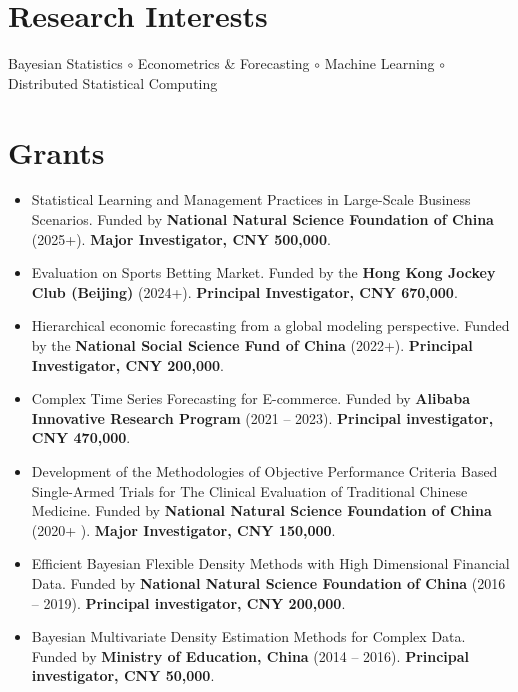 \documentclass[twoside,a4paper]{article}
\begin{document}
\section{Research Interests}

Bayesian Statistics $\circ$ Econometrics \& Forecasting $\circ$ Machine Learning $\circ$ Distributed Statistical Computing


\section{Grants}
\begin{itemize}

\item Statistical Learning and Management Practices in Large-Scale Business Scenarios. Funded by \textbf{National Natural Science Foundation of China} (2025+). \textbf{Major Investigator, CNY 500,000}.

\item Evaluation on Sports Betting Market. Funded by the \textbf{Hong Kong Jockey Club (Beijing)} (2024+). \textbf{Principal Investigator, CNY 670,000}.

\item Hierarchical economic forecasting from a global modeling perspective. Funded by the \textbf{National Social Science Fund of China} (2022+). \textbf{Principal Investigator, CNY 200,000}.

\item Complex Time Series Forecasting for E-commerce. Funded by \textbf{Alibaba Innovative Research Program} (2021 -- 2023). \textbf{Principal investigator, CNY 470,000}.

\item Development of the Methodologies of Objective Performance Criteria Based Single-Armed Trials for The Clinical Evaluation of Traditional Chinese Medicine. Funded by \textbf{National Natural Science Foundation of China} (2020+  ). \textbf{Major Investigator, CNY 150,000}.

\item Efficient Bayesian Flexible Density Methods with High Dimensional Financial Data. Funded by \textbf{National Natural Science Foundation of China} (2016 -- 2019). \textbf{Principal investigator, CNY 200,000}.

\item Bayesian Multivariate Density Estimation Methods for Complex Data. Funded by \textbf{Ministry of Education, China} (2014 -- 2016). \textbf{Principal investigator, CNY 50,000}.

\end{itemize}
\end{document}
